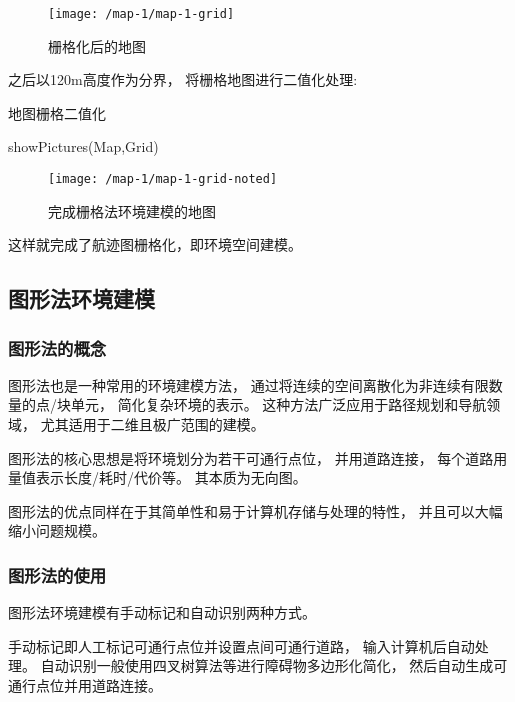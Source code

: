 \documentclass[12pt,a4paper,oneside,UTF8]{ctexart}
\begin{document}
\begin{figure}[H]
  \centering
  \texttt{[image: /map-1/map-1-grid]}
  \caption{栅格化后的地图}
  \label{fig:map-1-grid}
\end{figure}

之后以120m高度作为分界，
将栅格地图进行二值化处理:

\begin{algorithm}[H]
  \caption{地图栅格二值化}\label{algorithm-grid-noted}

  showPictures(Map,Grid)\;
\end{algorithm}

\begin{figure}[H]
  \centering
  \texttt{[image: /map-1/map-1-grid-noted]}
  \caption{完成栅格法环境建模的地图}
  \label{fig:map-1-grid-noted}
\end{figure}

这样就完成了航迹图栅格化，即环境空间建模。
\subsection{图形法环境建模}
\subsubsection{图形法的概念}
图形法也是一种常用的环境建模方法，
通过将连续的空间离散化为非连续有限数量的点/块单元，
简化复杂环境的表示。
这种方法广泛应用于路径规划和导航领域，
尤其适用于二维且极广范围的建模。

图形法的核心思想是将环境划分为若干可通行点位，
并用道路连接，
每个道路用量值表示长度/耗时/代价等。
其本质为无向图。

图形法的优点同样在于其简单性和易于计算机存储与处理的特性，
并且可以大幅缩小问题规模。
\subsubsection{图形法的使用}
图形法环境建模有手动标记和自动识别两种方式。

手动标记即人工标记可通行点位并设置点间可通行道路，
输入计算机后自动处理。
自动识别一般使用四叉树算法等进行障碍物多边形化简化，
然后自动生成可通行点位并用道路连接。
\end{document}
